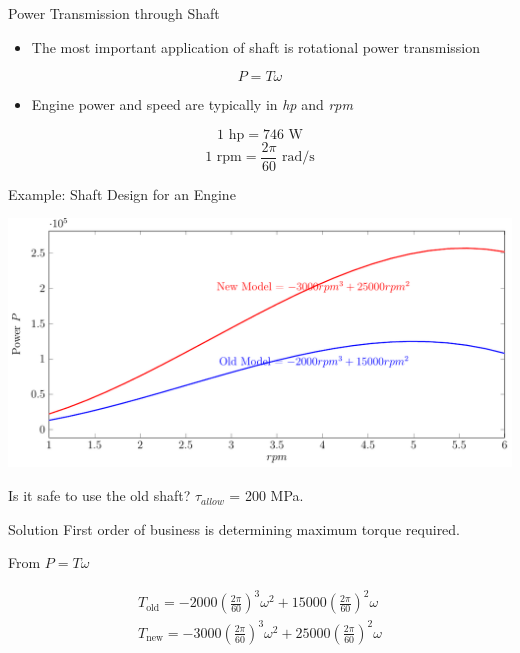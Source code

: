 \documentclass[10pt, svgnames]{beamer}
\begin{document}
\begin{frame}[label={sec:orgfa0f9ec}]{Power Transmission through Shaft}
\begin{itemize}
\item The most important application of shaft is rotational power
transmission
\end{itemize}

\[P = T\omega\]

\begin{itemize}
\item Engine power and speed are typically in \emph{hp} and \emph{rpm}
\end{itemize}

\[1 \text{ hp} = 746 \text{ W}\]
\[1 \text{ rpm} = \frac{2\pi}{60} \text{ rad/s}\]
\end{frame}

\begin{frame}[label={sec:org1b99915}]{Example: Shaft Design for an Engine}
\begin{center}
\includegraphics[width=.9\linewidth]{pictures/shaft-design-example.pdf}
\end{center}

Is it safe to use the old shaft? \(\tau_{allow}\) = 200 MPa.
\end{frame}

\begin{frame}[label={sec:org82be2e3}]{Solution}
First order of business is determining maximum torque required.

From \(P = T\omega\)

\begin{align*}
    T_{\text{old}} = -2000 (\frac{2\pi}{60})^{3} \omega^{2} + 15000 (\frac{2\pi}{60})^{2} \omega \\
    T_{\text{new}} = -3000 (\frac{2\pi}{60})^{3} \omega^{2} + 25000 (\frac{2\pi}{60})^{2} \omega
\end{align*}
\end{frame}
\end{document}

